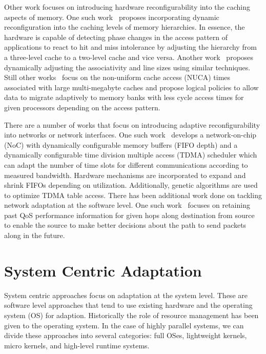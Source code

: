     Other work focuses on introducing hardware reconfigurability into the caching aspects of memory. One such work~\cite{Balasubramonian2000,BalasubramonianEtAl2000} proposes incorporating dynamic reconfiguration into the caching levels of memory hierarchies. In essence, the hardware is capable of detecting phase changes in the access pattern of applications to react to hit and miss intolerance by adjusting the hierarchy from a three-level cache to a two-level cache and vice versa. Another work~\cite{WangMishra2009} proposes dynamically adjusting the associativity and line sizes using similar techniques. Still other works~\cite{KimEtAl2002} focus on the non-uniform cache access (NUCA) times associated with large multi-megabyte caches and propose logical policies to allow data to migrate adaptively to memory banks with less cycle access times for given processors depending on the access pattern.
    
    There are a number of works that focus on introducing adaptive reconfigurability into networks or network interfaces. One such work~\cite{NoC_2013, NoC_2014} develops a network-on-chip (NoC) with dynamically configurable memory buffers (FIFO depth) and a dynamically configurable time division multiple access (TDMA) scheduler which can adapt the number of time slots for different communications according to measured bandwidth. Hardware mechanisms are incorporated to expand and shrink FIFOs depending on utilization. Additionally, genetic algorithms are used to optimize TDMA table access. There has been additional work done on tackling network adaptation at the software level. One such work~\cite{Gelenbe2013} focuses on retaining past QoS performance information for given hops along destination from source to enable the source to make better decisions about the path to send packets along in the future.

\section{System Centric Adaptation}
    \label{sec:SystemCentric}
    System centric approaches focus on adaptation at the system level. These are software level approaches that tend to use existing hardware and the operating system (OS) for adaption. Historically the role of resource management has been given to the operating system. In the case of highly parallel systems, we can divide these approaches into several categories: full OSes, lightweight kernels, micro kernels, and high-level runtime systems.

